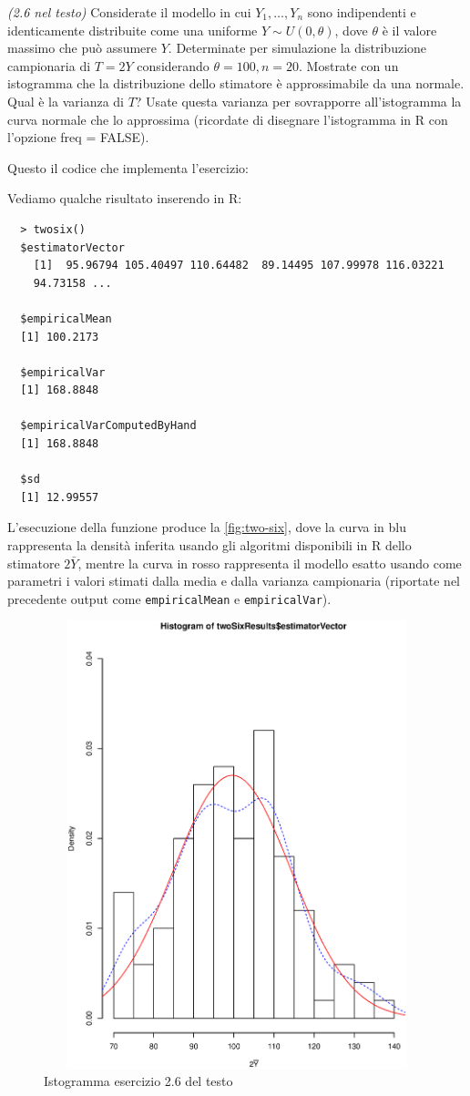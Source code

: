 \begin{exercise}{\emph{(2.6 nel testo)}}
  Considerate il modello in cui $Y_1,\ldots, Y_n$ sono indipendenti e
  identicamente distribuite come una uniforme $Y \sim U(0, \theta)$,
  dove $\theta$ \`e il valore massimo che pu\`o assumere $Y$.
  Determinate per simulazione la distribuzione campionaria di $T = 2Y$
  considerando $\theta = 100, n = 20$. Mostrate con un istogramma che
  la distribuzione dello stimatore \`e approssimabile da una
  normale. Qual \`e la varianza di $T$? Usate questa varianza per
  sovrapporre all'istogramma la curva normale che lo approssima
  (ricordate di disegnare l'istogramma in R con l'opzione freq =
  FALSE).
\end{exercise}
Questo il codice che implementa l'esercizio:

Vediamo qualche risultato inserendo in R:
\begin{lstlisting}
  > twosix()
  $estimatorVector
    [1]  95.96794 105.40497 110.64482  89.14495 107.99978 116.03221
    94.73158 ...
  
  $empiricalMean
  [1] 100.2173

  $empiricalVar
  [1] 168.8848

  $empiricalVarComputedByHand
  [1] 168.8848

  $sd
  [1] 12.99557
\end{lstlisting}
L'esecuzione della funzione produce la \autoref{fig:two-six}, dove la
curva in blu rappresenta la densit\`a inferita usando gli algoritmi
disponibili in R dello stimatore $2\bar{Y}$, mentre la curva in rosso
rappresenta il modello esatto usando come parametri i valori stimati
dalla media e dalla varianza campionaria (riportate nel precedente
output come \texttt{empiricalMean} e \texttt{empiricalVar}).
\begin{figure}[htb]
\centering
\includegraphics[height=13cm,width=13cm]{r-sources/exercises/chapter-two/two-six.ps}
\caption{Istogramma esercizio 2.6 del testo}
\label{fig:two-six}
\end{figure}

